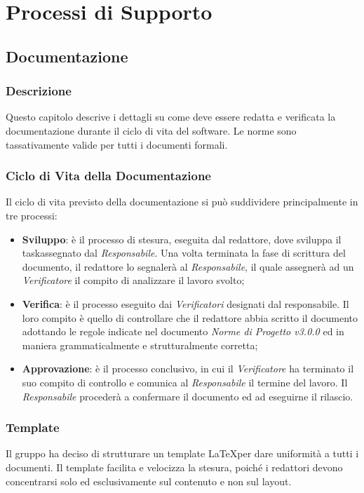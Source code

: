 \section{Processi di Supporto}\label{ProcessiSupporto}

\subsection{Documentazione}\label{ProcessiSupporto_Documentazione}

\subsubsection{Descrizione}
Questo capitolo descrive i dettagli su come deve essere redatta e verificata la documentazione durante il ciclo di vita del software. Le norme sono tassativamente valide per tutti i documenti formali.
\subsubsection{Ciclo di Vita della Documentazione}
Il ciclo di vita previsto della documentazione si può suddividere principalmente in tre processi:
\begin{itemize}
	\item \textbf{Sviluppo}: è il processo di stesura, eseguita dal redattore, dove sviluppa il task\glossario assegnato dal \textit{Responsabile}. Una volta terminata la fase di scrittura del documento, il redattore lo segnalerà al \textit{Responsabile}, il quale assegnerà ad un \textit{Verificatore} il compito di analizzare il lavoro svolto;
 	\item \textbf{Verifica}: è il processo eseguito dai \textit{Verificatori} designati dal responsabile. Il loro compito è quello di controllare che il redattore abbia scritto il documento adottando le regole indicate nel documento \textit{Norme di Progetto v3.0.0} ed in maniera grammaticalmente e strutturalmente corretta;
 	\item \textbf{Approvazione}: è il processo conclusivo, in cui il \textit{Verificatore} ha terminato il suo compito di controllo e comunica al \textit{Responsabile} il termine del lavoro. Il \textit{Responsabile} procederà a confermare il documento ed ad eseguirne il rilascio.
\end{itemize}

\subsubsection{Template}
Il gruppo ha deciso di strutturare un template \LaTeX  per dare uniformità a tutti i documenti. Il template facilita e velocizza la stesura, poiché i redattori devono concentrarsi solo ed esclusivamente sul contenuto e non sul layout.

